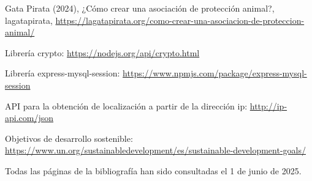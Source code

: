 \begin{thebibliography}{9}
 Gata Pirata (2024), ¿Cómo crear una asociación de protección animal?, lagatapirata, \href{https://lagatapirata.org/como-crear-una-asociacion-de-proteccion-animal/}{https://lagatapirata.org/como-crear-una-asociacion-de-proteccion-animal/}

 Librería crypto: \href{https://nodejs.org/api/crypto.html}{https://nodejs.org/api/crypto.html}


 Librería express-mysql-session: \href{https://www.npmjs.com/package/express-mysql-session}{https://www.npmjs.com/package/express-mysql-session}

API para la obtención de localización a partir de la dirección ip: \href{http://ip-api.com/json}{http://ip-api.com/json}

Objetivos de desarrollo sostenible: \href{hhttps://www.un.org/sustainabledevelopment/es/sustainable-development-goals/}{https://www.un.org/sustainabledevelopment/es/sustainable-development-goals/}

\end{thebibliography}
Todas las páginas de la bibliografía han sido consultadas el 1 de junio de 2025.




